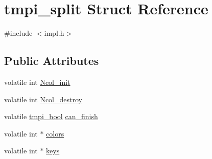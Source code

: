\hypertarget{structtmpi__split}{\section{tmpi\-\_\-split \-Struct \-Reference}
\label{structtmpi__split}
}


{\ttfamily \#include $<$impl.\-h$>$}

\subsection*{\-Public \-Attributes}
\begin{DoxyCompactItemize}
\item 
volatile int \hyperlink{structtmpi__split_ac00b33e1b0bfe014f97ffe83bfc0705d}{\-Ncol\-\_\-init}
\item 
volatile int \hyperlink{structtmpi__split_afb80611cc1cd63e7f3d10d461176f198}{\-Ncol\-\_\-destroy}
\item 
volatile \hyperlink{impl_8h_a1c904605658586a00645b5fc9f6b8479}{tmpi\-\_\-bool} \hyperlink{structtmpi__split_a2f0ccbbd63a05460cf84848a21950669}{can\-\_\-finish}
\item 
volatile int $\ast$ \hyperlink{structtmpi__split_a75f82d278c2cef170f4c74624eb3d4f0}{colors}
\item 
volatile int $\ast$ \hyperlink{structtmpi__split_aea289aa686b4a4e5e9d469a0f2f0adc8}{keys}
\end{DoxyCompactItemize}


